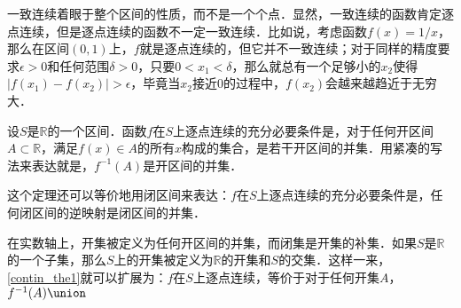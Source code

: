 一致连续着眼于整个区间的性质，而不是一个个点．显然，一致连续的函数肯定逐点连续，但是逐点连续的函数不一定一致连续．比如说，考虑函数$f(x)=1/x$，那么在区间$(0, 1)$上，$f$就是逐点连续的，但它并不一致连续；对于同样的精度要求$\epsilon>0$和任何范围$\delta>0$，只要$0<x_1<\delta$，那么就总有一个足够小的$x_2$使得$|f(x_1)-f(x_2)|>\epsilon$，毕竟当$x_2$接近$0$的过程中，$f(x_2)$会越来越趋近于无穷大．

\begin{theorem}{}\label{contin_the1}
设$S$是$\mathbb{R}$的一个区间．函数$f$在$S$上逐点连续的充分必要条件是，对于任何开区间$A\subset \mathbb{R}$，满足$f(x)\in A$的所有$x$构成的集合，是若干开区间的并集．用紧凑的写法来表达就是，$f^{-1}(A)$是开区间的并集．
\end{theorem}

这个定理还可以等价地用闭区间来表达：$f$在$S$上逐点连续的充分必要条件是，任何闭区间的逆映射是闭区间的并集．

在实数轴上，开集被定义为任何开区间的并集，而闭集是开集的补集．如果$S$是$\mathbb{R}$的一个子集，那么$S$上的开集被定义为$\mathbb{R}$的开集和$S$的交集．这样一来，\autoref{contin_the1}就可以扩展为：$f$在$S$上逐点连续，等价于对于任何开集$A$，$f^{-1}(A)\union$

